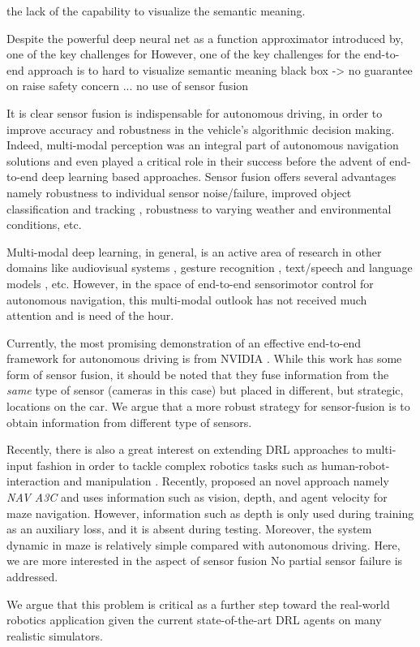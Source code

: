 \documentclass[../thesis.tex]{subfiles}
\begin{document}
the lack of the capability to visualize the semantic meaning. 

Despite the powerful deep neural net as a function approximator introduced by, one of the key challenges for 
However, one of the key challenges for the end-to-end approach is to 
hard to visualize semantic meaning 
black box -> no guarantee on 
raise safety concern ... 
no use of sensor fusion










It is clear sensor fusion is indispensable for autonomous driving, in order to improve accuracy and robustness in the vehicle's algorithmic decision making. Indeed, multi-modal perception was an integral part of autonomous navigation solutions and even played a critical role in their success \cite{multimodaltartan} before the advent of end-to-end deep learning based approaches. Sensor fusion offers several advantages namely robustness to individual sensor noise/failure, improved object classification and tracking \cite{elfring2016multisensor, cho2014multi, darms2008classification}, robustness to varying weather and environmental conditions, etc. 

Multi-modal deep learning, in general, is an active area of research in other domains like audiovisual systems \cite{ngmultimodal}, gesture recognition \cite{moddrop}, text/speech and language models \cite{languagemultimodal,srivastava2012multimodal}, etc. However, in the space of end-to-end sensorimotor control for autonomous navigation, this multi-modal outlook has not received much attention and is need of the hour.

Currently, the most promising demonstration of an effective end-to-end framework for autonomous driving is from NVIDIA \cite{nvidiacar}. While this work has some form of sensor fusion, it should be noted that they fuse information from the \textit{same} type of sensor (cameras in this case) but placed in different, but strategic, locations on the car. We argue that a more robust strategy for sensor-fusion is to obtain information from different type of sensors. 

Recently, there is also a great interest on extending DRL approaches to multi-input fashion in order to tackle complex robotics tasks such as human-robot-interaction \cite{qureshi2016robot} and manipulation \cite{levine2016end}. Recently, \citet{mirowski2017a} proposed an novel approach namely \textit{NAV A3C} and uses information such as vision, depth, and agent velocity for maze navigation. However, information such as depth is only used during training as an auxiliary loss, and it is absent during testing. Moreover, the system dynamic in maze is relatively simple compared with autonomous driving. Here, we are more interested 
in the aspect of sensor fusion
No partial sensor failure is addressed.


We argue that this problem is critical as a further step toward the real-world robotics application given the current state-of-the-art DRL agents on many realistic simulators. 

\end{document}
